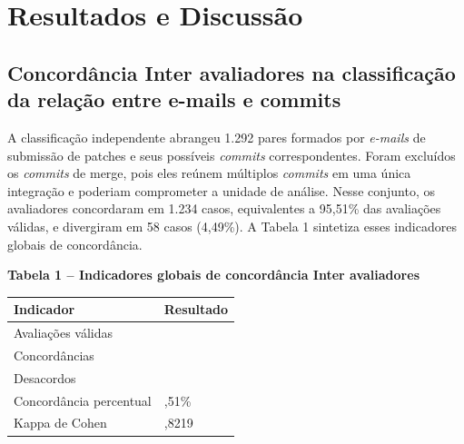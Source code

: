 

\newcommand{\sla}{\textbackslash}

\newcommand{\cmd}[1]{\textsf{#1}}

\newcommand{\pkg}[1]{\textsf{#1}}

\newcommand{\ltxcmd}[1]{\cmd{\sla{}#1}}

\chapter{Resultados e Discussão}
\label{chap:resultados}

\section{Concordância Inter avaliadores na classificação da relação entre e-mails e commits}
A classificação independente abrangeu 1.292 pares formados por
\textit{e-mails} de submissão de patches e seus possíveis \textit{commits}
correspondentes. Foram excluídos os \textit{commits} de merge, pois eles
reúnem múltiplos \textit{commits} em uma única integração e poderiam
comprometer a unidade de análise. Nesse conjunto, os avaliadores
concordaram em 1.234 casos, equivalentes a 95,51\% das avaliações
válidas, e divergiram em 58 casos (4,49\%). A Tabela 1 sintetiza esses
indicadores globais de concordância.

\textbf{Tabela 1 -- Indicadores globais de concordância Inter
	avaliadores}	
\begin{longtable}[]{@{}
			>{\raggedright\arraybackslash}p{}
			>{\centering\arraybackslash}p{}@{}}
		\toprule\noalign{}
		\begin{minipage}[b]{\linewidth}\raggedright
			\textbf{Indicador}
		\end{minipage} & \begin{minipage}[b]{\linewidth}\centering
			\textbf{Resultado}
		\end{minipage} \\
		\midrule\noalign{}
		\endhead
		\bottomrule\noalign{}
		\endlastfoot
		Avaliações válidas & 1.292 \\
		Concordâncias & 1.234 \\
		Desacordos & 58 \\
		Concordância percentual & 95,51\% \\
		Kappa de Cohen & 0,8219 \\
\end{longtable}

